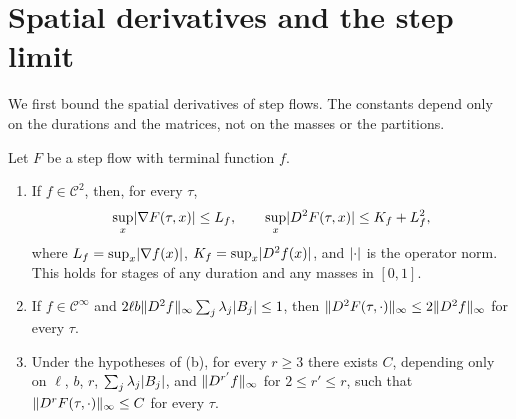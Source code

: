 \section{Spatial derivatives and the step limit}\label{sec:flow-spatial}

We first bound the spatial derivatives of step flows. The constants depend only
on the durations and the matrices, not on the masses or the partitions.

\begin{lemma}\label{lem:flow-spatial}
Let $F$ be a step flow with terminal function $f$.
\begin{enumerate}[label=\textup{(\alph*)}]
\item If $f\in\mathcal C^2$, then, for every $\tau$,
 \[
  \sup_x\lvert \nabla F(\tau,x)\rvert\le L_f,\qquad
  \sup_x\lvert D^2F(\tau,x)\rvert\le K_f+L_f^2,
 \]
 where $L_f=\sup_x\lvert \nabla f(x)\rvert$, $K_f=\sup_x\lvert D^2f(x)\rvert$, and $\lvert \cdot\rvert$
 is the operator norm. This holds for stages of any duration and any masses in
 $[0,1]$.
\item If $f\in\mathcal C^\infty$ and
 $2\ell b\lVert D^2f\rVert_\infty\sum_j\lambda_j\lvert B_j\rvert\le1$, then
 $\lVert D^2F(\tau,\cdot)\rVert_\infty\le2\lVert D^2f\rVert_\infty$ for every $\tau$.
\item Under the hypotheses of \textup{(b)}, for every $r\ge3$ there exists $C$,
 depending only on $\ell$, $b$, $r$, $\sum_j\lambda_j\lvert B_j\rvert$, and
 $\lVert D^{r'}f\rVert_\infty$ for $2\le r'\le r$, such that
 $\lVert D^rF(\tau,\cdot)\rVert_\infty\le C$ for every $\tau$.
\end{enumerate}
\end{lemma}

